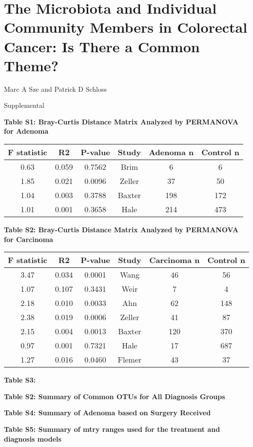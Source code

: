 \documentclass[12pt,]{article}
\title{}
\author{}
\date{}
\begin{document}
\section{The Microbiota and Individual Community Members in Colorectal
Cancer: Is There a Common
Theme?}\label{the-microbiota-and-individual-community-members-in-colorectal-cancer-is-there-a-common-theme}

\vspace{10mm}

\begin{center}
Marc A Sze and Patrick D Schloss

\vspace{10mm}

Supplemental
\end{center}

\newpage

\textbf{Table S1: Bray-Curtis Distance Matrix Analyzed by PERMANOVA for
Adenoma}

\begin{longtable}[]{@{}cccccc@{}}
\toprule
F statistic & R2 & P-value & Study & Adenoma n & Control
n\tabularnewline
\midrule
\endhead
0.63 & 0.059 & 0.7562 & Brim & 6 & 6\tabularnewline
1.85 & 0.021 & 0.0096 & Zeller & 37 & 50\tabularnewline
1.04 & 0.003 & 0.3788 & Baxter & 198 & 172\tabularnewline
1.01 & 0.001 & 0.3658 & Hale & 214 & 473\tabularnewline
\bottomrule
\end{longtable}

\newpage

\textbf{Table S2: Bray-Curtis Distance Matrix Analyzed by PERMANOVA for
Carcinoma}

\begin{longtable}[]{@{}cccccc@{}}
\toprule
F statistic & R2 & P-value & Study & Carcinoma n & Control
n\tabularnewline
\midrule
\endhead
3.47 & 0.034 & 0.0001 & Wang & 46 & 56\tabularnewline
1.07 & 0.107 & 0.3431 & Weir & 7 & 4\tabularnewline
2.18 & 0.010 & 0.0033 & Ahn & 62 & 148\tabularnewline
2.38 & 0.019 & 0.0006 & Zeller & 41 & 87\tabularnewline
2.15 & 0.004 & 0.0013 & Baxter & 120 & 370\tabularnewline
0.97 & 0.001 & 0.7321 & Hale & 17 & 687\tabularnewline
1.27 & 0.016 & 0.0460 & Flemer & 43 & 37\tabularnewline
\bottomrule
\end{longtable}

\newpage

\textbf{Table S3: } \footnotesize

\normalsize

\newpage

\newcommand{\blandscape}{\begin{landscape}}
\newcommand{\elandscape}{\end{landscape}}

\textbf{Table S2: Summary of Common OTUs for All Diagnosis Groups}

\footnotesize

\normalsize
\newpage

\textbf{Table S4: Summary of Adenoma based on Surgery Received}

\newpage

\textbf{Table S5: Summary of mtry ranges used for the treatment and
diagnosis models}

\footnotesize

\normalsize
\end{document}
